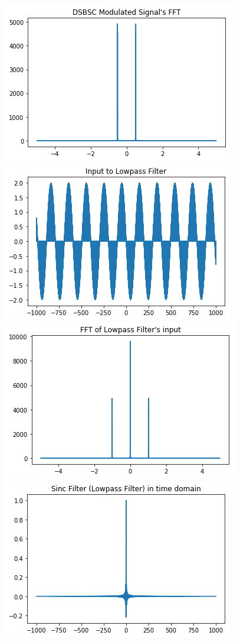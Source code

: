 \documentclass[12pt,a4paper]{article}%
\begin{document}
\begin{flushleft}
\begin{center}
			{\includegraphics[width=0.80 \textwidth]{./images/modu_fft.PNG}}
			{\includegraphics[width=0.80 \textwidth]{./images/lpf_inp.PNG}}\\\bigskip
			{\includegraphics[width=0.80 \textwidth]{./images/lpf_inp_fft.PNG}}
			{\includegraphics[width=0.80 \textwidth]{./images/sinc.PNG}}\\\bigskip

\end{center}
\end{flushleft}
\end{document}
